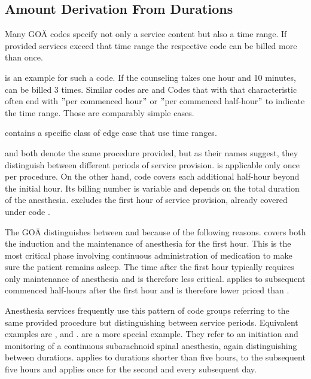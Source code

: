 \subsection{Amount Derivation From Durations}\label{subsec:amount-derivation-from-durations}

Many GOÄ codes specify not only a service content but also a time range.
If provided services exceed that time range the respective code can be billed more than once.

 is an example for such a code.
If the counseling takes one hour and 10 minutes,  can be billed 3 times.
Similar codes are 
and 
Codes that with that characteristic often end with \("\)per commenced hour\("\) or \("\)per commenced half-hour\("\) to indicate the time range.
Those are comparably simple cases.

 contains a specific class of edge case that use time ranges.

 and 
both denote the same procedure provided, but as their names suggest, they distinguish between different periods of service provision.
 is applicable only once per procedure.
On the other hand, code  covers each additional half-hour beyond the initial hour.
Its billing number is variable and depends on the total duration of the anesthesia.
 excludes the first hour of service provision, already covered under code .

The GOÄ distinguishes between  and  because of the following reasons.
 covers both the induction and the maintenance of anesthesia for the first hour.
This is the most critical phase involving continuous administration of medication to make sure the patient remains asleep.
The time after the first hour typically requires only maintenance of anesthesia and is therefore less critical.
 applies to subsequent commenced half-hours after the first hour and is therefore lower priced than .


Anesthesia services frequently use this pattern of code groups referring to the same provided procedure but distinguishing between service periods.
Equivalent examples are ,  and .
 are a more special example.
They refer to an initiation and monitoring of a continuous subarachnoid spinal anesthesia, again distinguishing between durations.
 applies to durations shorter than five hours,  to the subsequent five hours and  applies once for the second and every subsequent day.


